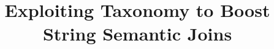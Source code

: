\documentclass{sig-alternate}
\newcommand{\topkm}{\mbox{top-$k$,$m$}}
\begin{document}


\title{Exploiting Taxonomy to Boost String Semantic Joins}


\author{
}




\maketitle
\end{document}
